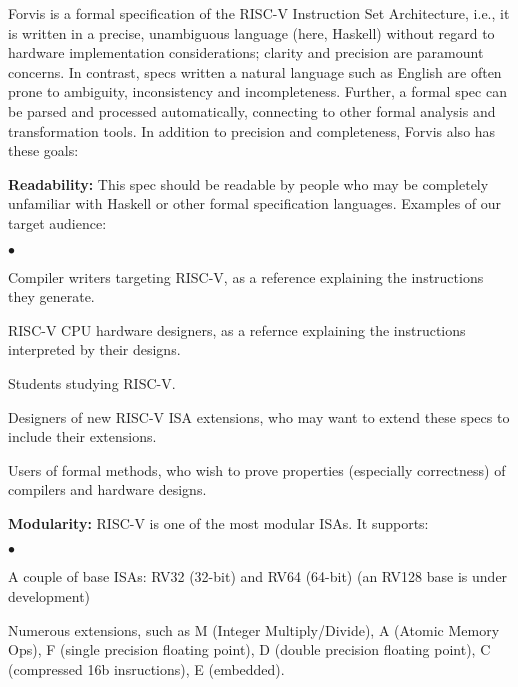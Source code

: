 \documentclass[11pt]{article}
\newenvironment{tightlist}%
{\begin{list}{$\bullet$}{%
    \setlength{\topsep}{0in}
    \setlength{\partopsep}{0in}
    \setlength{\itemsep}{0in}
    \setlength{\parsep}{0in}
    \setlength{\leftmargin}{1.5em}
    \setlength{\rightmargin}{0in}
    \setlength{\itemindent}{0in}
}
}%
{\end{list}
}
\begin{document}
Forvis is a formal specification of the RISC-V Instruction Set
Architecture, i.e., it is written in a precise, unambiguous language
(here, Haskell) without regard to hardware implementation
considerations; clarity and precision are paramount concerns.  In
contrast, specs written a natural language such as English are often
prone to ambiguity, inconsistency and incompleteness.  Further, a
formal spec can be parsed and processed automatically, connecting to
other formal analysis and transformation tools.  In addition to
precision and completeness, Forvis also has these goals:

\begin{itemize}

\item {\bf Readability:} This spec should be readable by people who
may be completely unfamiliar with Haskell or other formal
specification languages.  Examples of our target audience:

  \begin{tightlist}
   \item Compiler writers targeting RISC-V, as a reference explaining the instructions they generate.

   \item RISC-V CPU hardware designers, as a refernce explaining the instructions interpreted by their designs.

   \item Students studying RISC-V.

   \item Designers of new RISC-V ISA extensions, who may want to
   extend these specs to include their extensions.

   \item Users of formal methods, who wish to prove properties
   (especially correctness) of compilers and hardware designs.

  \end{tightlist}

\item {\bf Modularity:} RISC-V is one of the most modular ISAs.  It
supports:

  \begin{tightlist}
   \item A couple of base ISAs: RV32 (32-bit) and RV64 (64-bit) (an RV128 base is under development)

   \item Numerous extensions, such as M (Integer Multiply/Divide), A
    (Atomic Memory Ops), F (single precision floating point), D
    (double precision floating point), C (compressed 16b insructions), E (embedded).


\end{tightlist}
\end{itemize}
\end{document}

